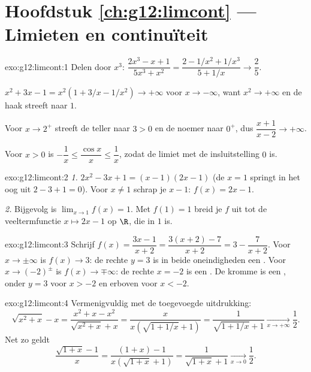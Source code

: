 \section*{Hoofdstuk \ref{ch:g12:limcont} --- Limieten en continuïteit}

\begin{solution}{exo:g12:limcont:1}
Delen door $x^3$:
$\dfrac{2x^3 - x + 1}{5x^3 + x^2} = \dfrac{2 - 1/x^2 + 1/x^3}{5 + 1/x}
\to \dfrac{2}{5}$.

$x^2 + 3x - 1 = x^2(1 + 3/x - 1/x^2) \to +\infty$ voor $x \to -\infty$, want
$x^2 \to +\infty$ en de haak streeft naar $1$.

Voor $x \to 2^+$ streeft de teller naar $3 > 0$ en de noemer naar $0^+$, dus
$\dfrac{x+1}{x-2} \to +\infty$.

Voor $x > 0$ is $-\dfrac1x \leq \dfrac{\cos x}{x} \leq \dfrac1x$, zodat de
limiet met de insluitstelling $0$ is.
\end{solution}

\begin{solution}{exo:g12:limcont:2}
\emph{1.} $2x^2 - 3x + 1 = (x-1)(2x-1)$ (de  $x=1$ springt in het oog
uit $2 - 3 + 1 = 0$). Voor $x \neq 1$ schrap je $x - 1$: $f(x) = 2x - 1$.

\emph{2.} Bijgevolg is $\lim_{x\to1} f(x) = 1$. Met $f(1) = 1$ breid je $f$
uit tot de veeltermfunctie $x \mapsto 2x-1$ op $\R$, die in $1$  is.
\end{solution}

\begin{solution}{exo:g12:limcont:3}
Schrijf $f(x) = \dfrac{3x - 1}{x + 2} = \dfrac{3(x+2) - 7}{x+2}
= 3 - \dfrac{7}{x+2}$. Voor $x \to \pm\infty$ is $f(x) \to 3$: de rechte
$y = 3$ is in beide oneindigheden een . Voor
$x \to (-2)^\pm$ is $f(x) \to \mp\infty$: de rechte $x = -2$ is een
. De kromme is een , onder $y=3$ voor $x > -2$ en
erboven voor $x < -2$.
\end{solution}

\begin{solution}{exo:g12:limcont:4}
Vermenigvuldig met de toegevoegde uitdrukking:
\[
\sqrt{x^2 + x} - x = \frac{x^2 + x - x^2}{\sqrt{x^2+x} + x}
= \frac{x}{x\left(\sqrt{1 + 1/x} + 1\right)}
= \frac{1}{\sqrt{1 + 1/x} + 1}
\xrightarrow[x\to+\infty]{} \frac{1}{2}.
\]
Net zo geldt
\[
\frac{\sqrt{1+x} - 1}{x} = \frac{(1+x) - 1}{x\left(\sqrt{1+x} + 1\right)}
= \frac{1}{\sqrt{1+x} + 1} \xrightarrow[x\to0]{} \frac{1}{2}.
\]
\end{solution}


